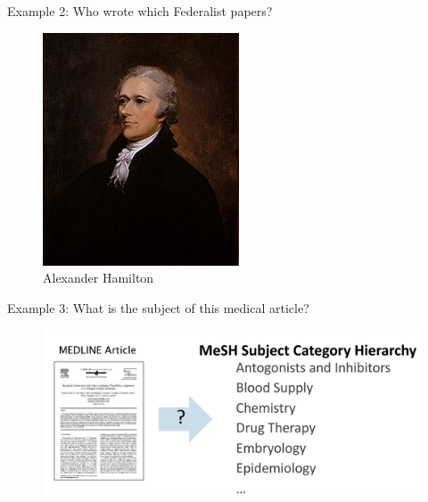 \documentclass[handout]{beamer}
\begin{document}
\begin{frame}{Example 2: Who wrote which Federalist papers?}
\begin{center}
\begin{figure}[h]
\begin{minipage}{0.3\textwidth}
                \centering
                \includegraphics[width=\linewidth]{pics/hamilton.png}
                \caption{Alexander Hamilton}
            \end{minipage}
        \end{figure}
    \end{center}
\end{frame}

\begin{frame}{Example 3: What is the subject of this medical article?}

\begin{figure}[h]
\includegraphics[scale = 0.2]{pics/medarticle.png}
\end{figure}


\end{frame}
\end{document}
